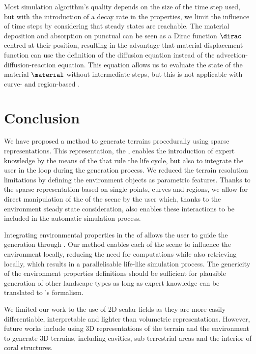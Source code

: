 Most simulation algorithm's quality depends on the size of the time step used, but with the introduction of a decay rate in the  properties, we limit the influence of time steps by considering that steady states are reachable. The material deposition and absorption on punctual  can be seen as a Dirac function $\dirac$ centred at their position, resulting in the advantage that material displacement function can use the definition of the diffusion equation instead of the advection-diffusion-reaction equation. This equation allows us to evaluate the state of the material $\material$ without intermediate steps, but this is not applicable with curve- and region-based .

\section{Conclusion}
\label{sec:env-obj-conclusion}
We have proposed a method to generate terrains procedurally using sparse representations. This representation, the , enables the introduction of expert knowledge by the means of the  that rule the  life cycle, but also to integrate the user in the loop during the generation process. We reduced the terrain resolution limitations by defining the environment objects as parametric features. Thanks to the sparse representation based on single points, curves and regions, we allow for direct manipulation of the  of the scene by the user which, thanks to the environment steady state consideration, also enables these interactions to be included in the automatic simulation process.

Integrating environmental properties in the  of  allows the user to guide the generation through . Our method enables each  of the scene to influence the environment locally, reducing the need for computations while also retrieving  locally, which results in a parallelisable life-like simulation process. The genericity of the environment properties definitions should be sufficient for plausible generation of other landscape types as long as expert knowledge can be translated to 's formalism.

We limited our work to the use of 2D scalar fields as they are more easily differentiable, interpretable and lighter than volumetric representations. However, future works include using 3D representations of the terrain and the environment to generate 3D terrains, including cavities, sub-terrestrial areas and the interior of coral structures.

